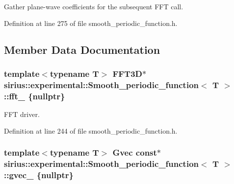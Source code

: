 Gather plane-\/wave coefficients for the subsequent F\+F\+T call. 



Definition at line 275 of file smooth\+\_\+periodic\+\_\+function.\+h.



\subsection{Member Data Documentation}
\hypertarget{classsirius_1_1experimental_1_1_smooth__periodic__function_a9b3daef8e28b49ae6457351ebc8309b7}{}
\subsubsection[{fft\+\_\+}]{\setlength{\rightskip}{0pt plus 5cm}template$<$typename T$>$ F\+F\+T3\+D$\ast$ {\bf sirius\+::experimental\+::\+Smooth\+\_\+periodic\+\_\+function}$<$ T $>$\+::fft\+\_\+ \{nullptr\}\hspace{0.3cm}{\ttfamily [protected]}}\label{classsirius_1_1experimental_1_1_smooth__periodic__function_a9b3daef8e28b49ae6457351ebc8309b7}


F\+F\+T driver. 



Definition at line 244 of file smooth\+\_\+periodic\+\_\+function.\+h.

\hypertarget{classsirius_1_1experimental_1_1_smooth__periodic__function_aaba661779354062cc879601bab773df5}{}
\subsubsection[{gvec\+\_\+}]{\setlength{\rightskip}{0pt plus 5cm}template$<$typename T$>$ Gvec const$\ast$ {\bf sirius\+::experimental\+::\+Smooth\+\_\+periodic\+\_\+function}$<$ T $>$\+::gvec\+\_\+ \{nullptr\}\hspace{0.3cm}{\ttfamily [protected]}}\label{classsirius_1_1experimental_1_1_smooth__periodic__function_aaba661779354062cc879601bab773df5}


